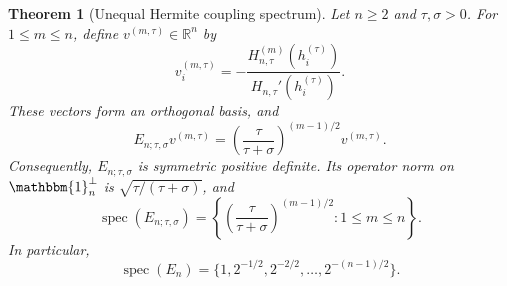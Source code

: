 \documentclass[12pt,reqno]{amsart}
\newtheorem{theorem}{Theorem}[section]
\theoremstyle{definition}
\theoremstyle{remark}
\newcommand{\R}{\mathbb R}
\newcommand{\one}{\mathbbm{1}_n}
\newcommand{\spec}{\operatorname{spec}}
\begin{document}
\begin{theorem}[Unequal Hermite coupling spectrum]
\label{thm:exact-spectrum}
Let \(n\geq2\) and \(\tau,\sigma>0\).  For \(1\leq m\leq n\), define
\(v^{(m,\tau)}\in\R^n\) by
\begin{equation}\label{eq:tangent-modes}
 v_i^{(m,\tau)}
 =-\frac{H_{n,\tau}^{(m)}(h_i^{(\tau)})}
         {H_{n,\tau}'(h_i^{(\tau)})}.
\end{equation}
These vectors form an orthogonal basis, and
\begin{equation}\label{eq:En-eigenvalues}
 E_{n;\tau,\sigma}v^{(m,\tau)}
 =\left(\frac{\tau}{\tau+\sigma}\right)^{(m-1)/2}
  v^{(m,\tau)}.
\end{equation}
Consequently, \(E_{n;\tau,\sigma}\) is symmetric positive definite.  Its
operator norm on \(\one^\perp\) is \(\sqrt{\tau/(\tau+\sigma)}\), and
\begin{equation}\label{eq:unequal-En-spectrum}
 \spec(E_{n;\tau,\sigma})
 =\left\{\left(\frac{\tau}{\tau+\sigma}\right)^{(m-1)/2}:
 1\leq m\leq n\right\}.
\end{equation}
In particular,
\begin{equation}\label{eq:En-spectrum}
 \spec(E_n)=\{1,2^{-1/2},2^{-2/2},\ldots,2^{-(n-1)/2}\}.
\end{equation}
\end{theorem}
\end{document}
